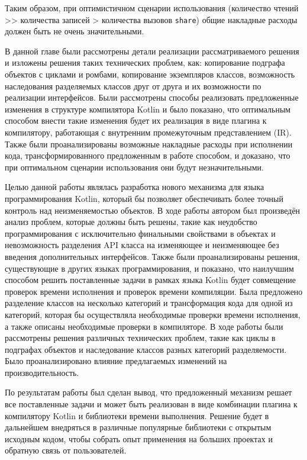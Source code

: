 \documentclass[specification,annotation,times]{itmo-student-thesis}
\begin{document}
Таким образом, при оптимистичном сценарии использования (количество чтений >{}> количества записей > количества вызовов \texttt{share})
общие накладные расходы должен быть не очень значительными.


\chapterconclusion

В данной главе были рассмотрены детали реализации рассматриваемого решения и изложены решения таких технических проблем, как: копирование подграфа объектов с циклами и ромбами, копирование экземпляров классов, возможность наследования разделяемых классов друг от друга и их возможности по реализации интерфейсов.
Были рассмотрены способы реализовать предложенные изменения в структуре компилятора Kotlin и было показано, что оптимальным способом внести такие изменения будет их реализация в виде плагина к компилятору, работающая с внутренним промежуточным представлением (IR).
Также были проанализированы возможные накладные расходы при исполнении кода, трансформированного предложенным в работе способом, и доказано, что при оптимальном сценарии использования они будут незначительными.


\startconclusionpage

Целью данной работы являлась разработка нового механизма для языка программирования Kotlin, который бы позволяет обеспечивать более точный контроль над неизменяемостью объектов.
В ходе работы автором был произведён анализ проблем, которые должны быть решены, такие как неудобство программирования с исключительно финальными свойствами в объектах и невозможность разделения API класса на изменяющее и неизменяющее без введения дополнительных интерфейсов.
Также были проанализированы решения, существующие в других языках программирования, и показано, что наилучшим способом решить поставленные задачи в рамках языка Kotlin будет совмещение проверок времени исполнения и проверок времени компиляции.
Была предложено разделение классов на несколько категорий и трансформация кода для одной из категорий, которая бы осуществляла необходимые проверки времени исполнения, а также описаны необходимые проверки в компиляторе.
В ходе работы были рассмотрены решения различных технических проблем, такие как циклы в подграфах объектов и наследование классов разных категорий разделяемости. Было проанализировано влияние предлагаемых изменений на производительность.

По результатам работы был сделан вывод, что предложенный механизм решает все поставленные задачи и может быть реализован в виде комбинации плагина к компилятору Kotlin и библиотеки времени выполнения.
Решение будет в дальнейшем внедряться в различные популярные библиотеки с открытым исходным кодом, чтобы собрать опыт применения на больших проектах и обратную связь от пользователей.
\end{document}

